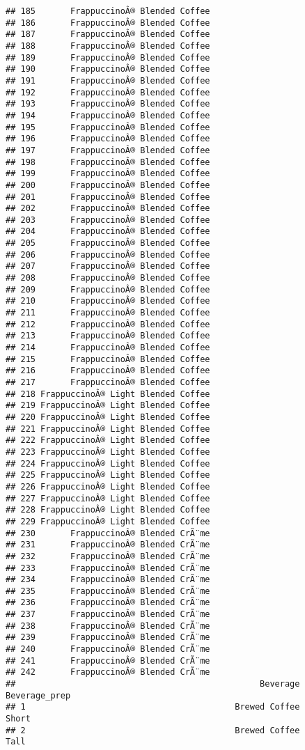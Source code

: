 \documentclass[
]{article}
\begin{document}
\begin{verbatim}
## 185       FrappuccinoÂ® Blended Coffee
## 186       FrappuccinoÂ® Blended Coffee
## 187       FrappuccinoÂ® Blended Coffee
## 188       FrappuccinoÂ® Blended Coffee
## 189       FrappuccinoÂ® Blended Coffee
## 190       FrappuccinoÂ® Blended Coffee
## 191       FrappuccinoÂ® Blended Coffee
## 192       FrappuccinoÂ® Blended Coffee
## 193       FrappuccinoÂ® Blended Coffee
## 194       FrappuccinoÂ® Blended Coffee
## 195       FrappuccinoÂ® Blended Coffee
## 196       FrappuccinoÂ® Blended Coffee
## 197       FrappuccinoÂ® Blended Coffee
## 198       FrappuccinoÂ® Blended Coffee
## 199       FrappuccinoÂ® Blended Coffee
## 200       FrappuccinoÂ® Blended Coffee
## 201       FrappuccinoÂ® Blended Coffee
## 202       FrappuccinoÂ® Blended Coffee
## 203       FrappuccinoÂ® Blended Coffee
## 204       FrappuccinoÂ® Blended Coffee
## 205       FrappuccinoÂ® Blended Coffee
## 206       FrappuccinoÂ® Blended Coffee
## 207       FrappuccinoÂ® Blended Coffee
## 208       FrappuccinoÂ® Blended Coffee
## 209       FrappuccinoÂ® Blended Coffee
## 210       FrappuccinoÂ® Blended Coffee
## 211       FrappuccinoÂ® Blended Coffee
## 212       FrappuccinoÂ® Blended Coffee
## 213       FrappuccinoÂ® Blended Coffee
## 214       FrappuccinoÂ® Blended Coffee
## 215       FrappuccinoÂ® Blended Coffee
## 216       FrappuccinoÂ® Blended Coffee
## 217       FrappuccinoÂ® Blended Coffee
## 218 FrappuccinoÂ® Light Blended Coffee
## 219 FrappuccinoÂ® Light Blended Coffee
## 220 FrappuccinoÂ® Light Blended Coffee
## 221 FrappuccinoÂ® Light Blended Coffee
## 222 FrappuccinoÂ® Light Blended Coffee
## 223 FrappuccinoÂ® Light Blended Coffee
## 224 FrappuccinoÂ® Light Blended Coffee
## 225 FrappuccinoÂ® Light Blended Coffee
## 226 FrappuccinoÂ® Light Blended Coffee
## 227 FrappuccinoÂ® Light Blended Coffee
## 228 FrappuccinoÂ® Light Blended Coffee
## 229 FrappuccinoÂ® Light Blended Coffee
## 230       FrappuccinoÂ® Blended CrÃ¨me
## 231       FrappuccinoÂ® Blended CrÃ¨me
## 232       FrappuccinoÂ® Blended CrÃ¨me
## 233       FrappuccinoÂ® Blended CrÃ¨me
## 234       FrappuccinoÂ® Blended CrÃ¨me
## 235       FrappuccinoÂ® Blended CrÃ¨me
## 236       FrappuccinoÂ® Blended CrÃ¨me
## 237       FrappuccinoÂ® Blended CrÃ¨me
## 238       FrappuccinoÂ® Blended CrÃ¨me
## 239       FrappuccinoÂ® Blended CrÃ¨me
## 240       FrappuccinoÂ® Blended CrÃ¨me
## 241       FrappuccinoÂ® Blended CrÃ¨me
## 242       FrappuccinoÂ® Blended CrÃ¨me
##                                                 Beverage      Beverage_prep
## 1                                          Brewed Coffee              Short
## 2                                          Brewed Coffee               Tall

\end{verbatim}
\end{document}
